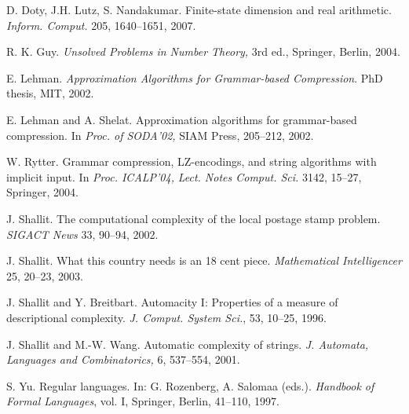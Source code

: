 \documentclass[copyright]{eptcs}
\begin{document}
{\begin{thebibliography}{99}
 D. Doty, J.H. Lutz, S. Nandakumar.
Finite-state dimension and real arithmetic.
{\em Inform. Comput.} 205, 1640--1651, 2007.


 R. K. Guy.
{\em Unsolved Problems in Number Theory,} 3rd ed.,
Springer, Berlin, 2004.

 E. Lehman.
{\em Approximation Algorithms for Grammar-based Compression}.
PhD thesis, MIT, 2002.

 E. Lehman and A. Shelat.
Approximation algorithms for grammar-based compression.
In {\em Proc. of SODA'02,} SIAM Press,  205--212, 2002.





 W. Rytter. Grammar compression, LZ-encodings,
and string algorithms with implicit input.
In {\em Proc. ICALP'04,} {\em Lect. Notes Comput. Sci.} 3142,
15--27, Springer, 2004.



 J. Shallit. The computational complexity of the local
postage stamp problem. {\em SIGACT News} 33, 90--94, 2002.

 J. Shallit.
What this country needs is an 18 cent piece.
{\em Mathematical Intelligencer} 25,  20--23, 2003.

 J. Shallit and Y. Breitbart. Automacity I: Properties of
a measure of descriptional complexity.
{\em J. Comput. System Sci.}, 53, 10--25, 1996.

 J. Shallit and M.-W. Wang.
Automatic complexity of strings.
{\em J. Automata, Languages and Combinatorics,} 6,  537--554, 2001.





 S. Yu. Regular languages.
In: G. Rozenberg, A. Salomaa (eds.). {\em  Handbook of
Formal Languages}, vol. I, Springer, Berlin,   41--110, 1997.




\end{thebibliography}
} 
\end{document}
